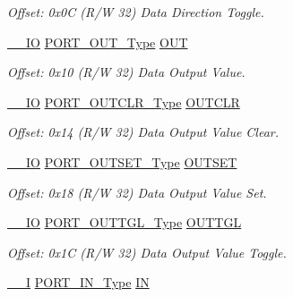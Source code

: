 \begin{DoxyCompactItemize}
\begin{DoxyCompactList}\small\item\em Offset\+: 0x0C (R/W 32) Data Direction Toggle. \end{DoxyCompactList}\item 
\mbox{\hyperlink{core__cm0plus_8h_aec43007d9998a0a0e01faede4133d6be}{\+\_\+\+\_\+\+IO}} \mbox{\hyperlink{union_p_o_r_t___o_u_t___type}{P\+O\+R\+T\+\_\+\+O\+U\+T\+\_\+\+Type}} \mbox{\hyperlink{struct_port_group_a2ee0b79ec23d5e8846e2e40e668954b6}{O\+UT}}
\begin{DoxyCompactList}\small\item\em Offset\+: 0x10 (R/W 32) Data Output Value. \end{DoxyCompactList}\item 
\mbox{\hyperlink{core__cm0plus_8h_aec43007d9998a0a0e01faede4133d6be}{\+\_\+\+\_\+\+IO}} \mbox{\hyperlink{union_p_o_r_t___o_u_t_c_l_r___type}{P\+O\+R\+T\+\_\+\+O\+U\+T\+C\+L\+R\+\_\+\+Type}} \mbox{\hyperlink{struct_port_group_a0c8aa9e1ff193914f6ada585997da7c3}{O\+U\+T\+C\+LR}}
\begin{DoxyCompactList}\small\item\em Offset\+: 0x14 (R/W 32) Data Output Value Clear. \end{DoxyCompactList}\item 
\mbox{\hyperlink{core__cm0plus_8h_aec43007d9998a0a0e01faede4133d6be}{\+\_\+\+\_\+\+IO}} \mbox{\hyperlink{union_p_o_r_t___o_u_t_s_e_t___type}{P\+O\+R\+T\+\_\+\+O\+U\+T\+S\+E\+T\+\_\+\+Type}} \mbox{\hyperlink{struct_port_group_a943dbc3729651ff07a14e77161f99d14}{O\+U\+T\+S\+ET}}
\begin{DoxyCompactList}\small\item\em Offset\+: 0x18 (R/W 32) Data Output Value Set. \end{DoxyCompactList}\item 
\mbox{\hyperlink{core__cm0plus_8h_aec43007d9998a0a0e01faede4133d6be}{\+\_\+\+\_\+\+IO}} \mbox{\hyperlink{union_p_o_r_t___o_u_t_t_g_l___type}{P\+O\+R\+T\+\_\+\+O\+U\+T\+T\+G\+L\+\_\+\+Type}} \mbox{\hyperlink{struct_port_group_aec604143a1d0cc5cb0508fcbaac3b0c8}{O\+U\+T\+T\+GL}}
\begin{DoxyCompactList}\small\item\em Offset\+: 0x1C (R/W 32) Data Output Value Toggle. \end{DoxyCompactList}\item 
\mbox{\hyperlink{core__cm0plus_8h_af63697ed9952cc71e1225efe205f6cd3}{\+\_\+\+\_\+I}} \mbox{\hyperlink{union_p_o_r_t___i_n___type}{P\+O\+R\+T\+\_\+\+I\+N\+\_\+\+Type}} \mbox{\hyperlink{struct_port_group_a8ec8f85412233cb9993f9622ec106aa0}{IN}}

\end{DoxyCompactItemize}
